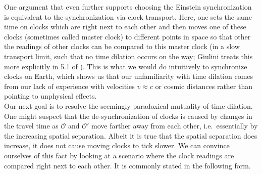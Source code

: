 One argument that even further supports choosing the Einstein synchronization is equivalent to the synchronization via clock transport. Here, one sets the same time on clocks which are right next to each other and then moves one of these clocks (sometimes called master clock) to different points in space so that other the readings of other clocks can be compared to this master clock (in a slow transport limit, such that no time dilation occurs on the way; Giulini treats this more explicitly in 5.1 of \cite{giulini_srt}). This is what we would do intuitively to synchronize clocks on Earth, which shows us that our unfamiliarity with time dilation comes from our lack of experience with velocities $v \approx c$ or cosmic distances rather than pointing to unphysical effects.\\


Our next goal is to resolve the seemingly paradoxical mutuality of time dilation. One might suspect that the de-synchronization of clocks is caused by changes in the travel time as $\mathcal{O}$ and $\mathcal{O}'$ move farther away from each other, i.e.~essentially by the increasing spatial separation. Albeit it is true that the spatial separation does increase, it does not cause moving clocks to tick slower. We can convince ourselves of this fact by looking at a scenario where the clock readings are compared right next to each other. It is commonly stated in the following form.
